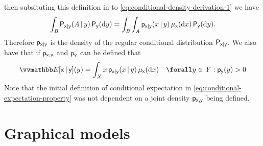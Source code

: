 then subsituting this definition in to \eqref{eq:conditional-density-derivation-1} we have
\begin{equation}\label{eq:conditional-density-derivation-2}
  \int_{\mathit{B}} \mathsf{P}_{\mathsf{x}|\mathsf{y}}(\mathit{A}\operatorname{|} y) \,\mathsf{P}_{\mathsf{y}}(\mathrm{d} y)
  =
  \int_{\mathit{B}}\int_{\mathit{A}} 
    \mathsf{p}_{\mathsf{x}|\mathsf{y}}(x\operatorname{|} y)
  \,\mu_{\mathsf{x}}(\mathrm{d} x)\,\mathsf{P}_{\mathsf{y}}(\mathrm{d} y).
\end{equation}
Therefore $\mathsf{p}_{\mathsf{x}|\mathsf{y}}$ is the density of the regular conditional distribution $\mathsf{P}_{\mathsf{x}|\mathsf{y}}$. We also have that if $\mathsf{p}_{\mathsf{x},\mathsf{y}}$ and $\mathsf{p}_{\mathsf{y}}$ can be defined that 
\begin{equation}\label{eq:conditional-expectation-density}
  \expc{\rvar{x}\gvn\rvar{y}}(y) =
  \int_{\set{X}} x\,\pden{\rvar{x}|\rvar{y}}(x\gvn y) \,\mu_{\rvar{x}}(\dr x)
  \quad \forall y \in \set{Y} : \pden{\rvar{y}}(y) > 0
\end{equation}
Note that the initial definition of conditional expectation in \eqref{eq:conditional-expectation-property} was not dependent on a joint density $\mathsf{p}_{\mathsf{x},\mathsf{y}}$ being defined. %


\section{Graphical models}\label{sec:graphical-models}

